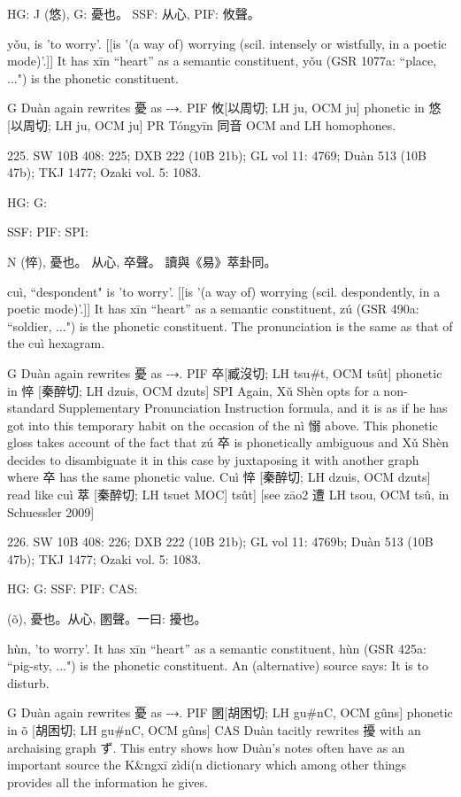 {HG: J (悠),
G:	憂也。
SSF: 从心,
PIF: 攸聲。


yǒu,
is 'to worry'. [[is '(a way of) worrying (scil. intensely or wistfully, in a poetic mode)'.]]
It has xīn ``heart'' as a semantic constituent,
yǒu (GSR 1077a: ``place, ...") is the phonetic constituent.

G	Duàn again rewrites 憂 as ⤏.
PIF     攸[以周切; LH ju, OCM ju] phonetic in 悠 [以周切; LH ju, OCM ju]
PR	Tóngyīn 同音 OCM and LH homophones.

225. SW 10B 408: 225; DXB 222 (10B 21b); GL vol 11: 4769; Duàn 513 (10B 47b); TKJ 1477; Ozaki vol. 5: 1083.


HG:
G:

SSF: PIF: SPI:

N (悴),
憂也。
从心, 卒聲。
讀與《易》萃卦同。


cuì, ``despondent"
is 'to worry'. [[is '(a way of) worrying (scil. despondently, in a poetic mode)'.]]
It has xīn ``heart'' as a semantic constituent,
zú (GSR 490a: ``soldier, ...") is the phonetic constituent. The pronunciation is the same as that of the cuì hexagram.



G    Duàn again rewrites 憂 as ⤏.
PIF    卒[臧沒切; LH tsu\#t, OCM tsût] phonetic in 悴 [秦醉切; LH dzuis, OCM dzuts]
SPI    Again, Xǔ Shèn opts for a non-standard Supplementary Pronunciation Instruction formula, and it is as if he has got into this temporary habit on the occasion of the nì 愵 above. This phonetic gloss takes account of the fact that zú 卒 is phonetically ambiguous and Xǔ Shèn decides to disambiguate it in this case by juxtaposing it with another graph where 卒 has the same phonetic value.
    Cuì 悴 [秦醉切; LH dzuis, OCM dzuts] read like cuì 萃 [秦醉切; LH tsuet MOC] tsût] [see zāo2 遭 LH tsou, OCM tsû, in Schuessler 2009]

226. SW 10B 408: 226; DXB 222 (10B 21b); GL vol 11: 4769b; Duàn 513 (10B 47b); TKJ 1477; Ozaki vol. 5: 1083.


HG:
G: SSF: PIF: CAS:

} (õ),
憂也。从心, 圂聲。一曰: 擾也。


hùn,
'to worry'.
It has xīn ``heart'' as a semantic constituent,
hùn (GSR 425a: ``pig-sty, ...") is the phonetic constituent. An (alternative) source says:
It is to disturb.

G	Duàn again rewrites 憂 as ⤏.
PIF     圂[胡困切; LH gu\#nC, OCM gûns] phonetic in õ [胡困切; LH gu\#nC, OCM gûns]
CAS Duàn tacitly rewrites 擾 with an archaising graph ず.
This entry shows how Duàn's notes often have as an important source the K&ngxī zìdi(n
dictionary which among other things provides all the information he gives.


